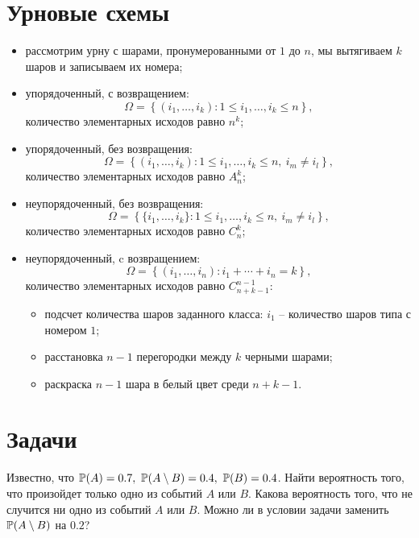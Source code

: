 \section*{Урновые схемы}
\begin{itemize}
    \item
    рассмотрим урну с шарами, пронумерованными от $1$ до $n$, мы вытягиваем $k$ шаров и записываем их номера;
    \item
    упорядоченный, с возвращением:
    \[
        \Omega = \left\{ (i_1, \ldots, i_k): 1 \leq i_1, \ldots, i_k \leq n \right\},
    \]
    количество элементарных исходов равно $n^k$;
    \item
    упорядоченный, без возвращения:
    \[
        \Omega = \left\{ (i_1, \ldots, i_k): 1 \leq i_1, \ldots, i_k \leq n,\ i_m \neq i_l \right\},
    \]
    количество элементарных исходов равно $A_n^k$;
    \item
    неупорядоченный, без возвращения: 
    \[
        \Omega = \left\{ \{i_1, \ldots, i_k\}: 1 \leq i_1, \ldots, i_k \leq n,\ i_m \neq i_l \right\},
    \]
    количество элементарных исходов равно $C_n^k$;
    \item
    неупорядоченный, c возвращением: 
    \[
        \Omega = \left\{(i_1, \ldots, i_n): i_1 + \cdots + i_n = k \right\},
    \]
    количество элементарных исходов равно $C^{n - 1}_{n + k - 1}$:
    \begin{itemize}
        \item подсчет количества шаров заданного класса: $i_1$ -- количество шаров типа с номером $1$;
        \item расстановка $n - 1$ перегородки между $k$ черными шарами;
        \item раскраска $n - 1$ шара в белый цвет среди $n + k - 1$.
    \end{itemize} 
\end{itemize}

\section*{Задачи}
\begin{problem}
    Известно, что $\operatorname{\mathbb{P}}(A) = 0.7,\ \operatorname{\mathbb{P}}(A \setminus B) = 0.4,\ \operatorname{\mathbb{P}}(B) = 0.4$.
    Найти вероятность того, что произойдет только одно из событий $A$ или $B$.
    Какова вероятность того, что не случится ни одно из событий $A$ или $B$.
    Можно ли в условии задачи заменить $\operatorname{\mathbb{P}}(A \setminus B)$ на  $0.2$?
\end{problem}

